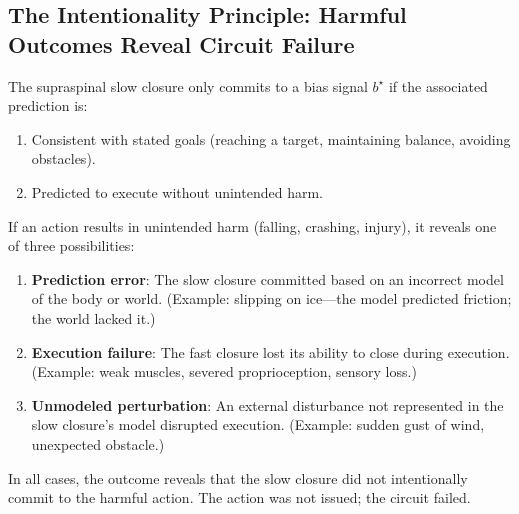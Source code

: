 \subsection{The Intentionality Principle: Harmful Outcomes Reveal Circuit Failure}

\begin{principle}
\label{prin:intentionality}
The supraspinal slow closure only commits to a bias signal $b^{\star}$ if the associated prediction is:
\begin{enumerate}[label=(\roman*),leftmargin=*,itemsep=1pt]
\item Consistent with stated goals (reaching a target, maintaining balance, avoiding obstacles).
\item Predicted to execute without unintended harm.
\end{enumerate}

If an action results in unintended harm (falling, crashing, injury), it reveals one of three possibilities:
\begin{enumerate}[label=(\alph*),leftmargin=*,itemsep=1pt]
\item \textbf{Prediction error}: The slow closure committed based on an incorrect model of the body or world. (Example: slipping on ice—the model predicted friction; the world lacked it.)
\item \textbf{Execution failure}: The fast closure lost its ability to close during execution. (Example: weak muscles, severed proprioception, sensory loss.)
\item \textbf{Unmodeled perturbation}: An external disturbance not represented in the slow closure's model disrupted execution. (Example: sudden gust of wind, unexpected obstacle.)
\end{enumerate}

In all cases, the outcome reveals that the slow closure did not intentionally commit to the harmful action. The action was not issued; the circuit failed.
\end{principle}

